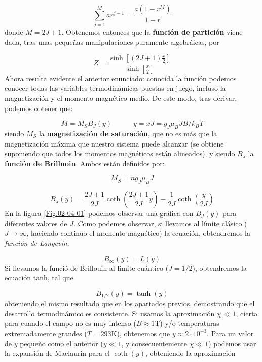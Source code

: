 \documentclass[12pt,a4paper]{book}
\numberwithin{equation}{section}
\numberwithin{figure}{section}
\newcommand{\tquad}{\quad \quad \quad}
\newcommand{\parentesis}[1]{\left( #1  \right)}
\newcommand{\ccorchetes}[1]{\left[ #1  \right]}
\begin{document}
$$ \sum_{j=1}^M a r^{j-1} = \frac{a (1-r^M)}{1-r} $$
donde $M=2J+1$. Obtenemos entonces que la \textbf{función de partición} viene dada, tras unas pequeñas manipulaciones puramente algebráicas, por

\begin{equation}
Z = \frac{\sinh \ccorchetes{(2J+1)\frac{x}{2}}}{\sinh \ccorchetes{\frac{x}{2}}}
\end{equation}
Ahora resulta evidente el anterior enunciado: conocida la función podemos conocer todas las variables termodinámicas puestas en juego, incluso la magnetización y el momento magnético medio. De este modo, tras derivar, podemos obtener que:

\begin{equation}
M = M_S B_J (y) \tquad y = x J = g_J \mu_B J B / k_B T
\end{equation}
siendo $M_S$ la \textbf{magnetización de saturación}, que no es más que la magnetización máxima que nuestro sistema puede alcanzar (se obtiene suponiendo que todos los momentos magnéticos están alineados), y siendo $B_J$ la \textbf{función de Brilluoin}. Ambos están definidos por:

\begin{equation}
    M_S = n g_J \mu_B J
\end{equation}

\begin{equation}
    B_J (y) = \frac{2J+1}{2J} \coth \parentesis{\frac{2J +1}{2J} y} - \frac{1}{2J} \coth \parentesis{\frac{y}{2J}}
\end{equation}
En la figura \ref{Fig:02-04-01} podemos observar una gráfica con $B_J(y)$ para diferentes valores de $J$. Como podemos observar, si llevamos al límite clásico ($J\rightarrow \infty$, haciendo continuo el momento magnético) la ecuación,  obtendremos la \textit{función de Langevin}:

\begin{equation}
    B_{\infty} (y) = L(y)
\end{equation}
Si llevamos la funció de Brillouin al límite cuántico ($J=1/2$), obtendremos la ecuación tanh, tal que

\begin{equation}
    B_{1/2} (y) = \tanh(y)
\end{equation}
obteniendo el mismo resultado que en los apartados previos, demostrando que el desarrollo termodinámico es consistente. Si usamos la aproximación $\chi \ll 1$, cierta para cuando el campo no es muy intenso ($B \approx 1$T) y/o temperaturas extremadamente grandes ($T=293$K), obtenemos que $y\approx 2\cdot 10^{-3}$. Para un valor de $y$ pequeño como el anterior ($y \ll 1$, y consecuentemente $\chi \ll 1$) podemos usar la expansión de Maclaurin para el $\coth (y)$, obteniendo la aproximación
\end{document}
